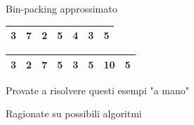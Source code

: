 \begin{frame}{Bin-packing approssimato}

\vspace{-9pt}
\begin{myboxtitle}[Esempio -- $k=8$]
\begin{tabular}{|c|c|c|c|c|c|c|}
\hline
3 & 7 & 2 & 5 & 4 & 3 & 5 \\\hline
\end{tabular}
\end{myboxtitle}

\begin{myboxtitle}[Esempio -- $k=10$]
\begin{tabular}{|c|c|c|c|c|c|c|c|}
\hline
3 & 2 & 7 & 5 & 3 & 5 & 10 & 5 \\\hline
\end{tabular}
\end{myboxtitle}

\begin{myboxtitle}[Esercizi]
\BIL
\item Provate a risolvere questi esempi "a mano"
\item Ragionate su possibili algoritmi
\EIL
\end{myboxtitle}

\end{frame}




